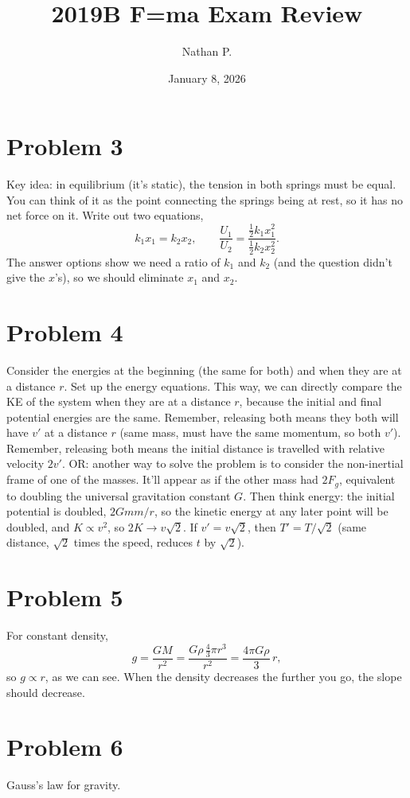 \documentclass[11pt]{article}
\title{2019B F=ma Exam Review}
\author{Nathan P.}
\date{January 8, 2026}
\begin{document}
\maketitle

\section*{Problem 3}
Key idea: in equilibrium (it's static), the tension in both springs must be equal. You can think of it as the point connecting the springs being at rest, so it has no net force on it.
Write out two equations,
\[
k_1x_1=k_2x_2,\qquad \frac{U_1}{U_2}=\frac{\tfrac12k_1x_1^2}{\tfrac12k_2x_2^2}.
\]
The answer options show we need a ratio of $k_1$ and $k_2$ (and the question didn't give the $x$'s), so we should eliminate $x_1$ and $x_2$.

\section*{Problem 4}
Consider the energies at the beginning (the same for both) and when they are at a distance $r$. Set up the energy equations. This way, we can directly compare the KE of the system when they are at a distance $r$, because the initial and final potential energies are the same.
Remember, releasing both means they both will have $v'$ at a distance $r$ (same mass, must have the same momentum, so both $v'$).
Remember, releasing both means the initial distance is travelled with relative velocity $2v'$.
OR: another way to solve the problem is to consider the non-inertial frame of one of the masses. It'll appear as if the other mass had $2F_g$, equivalent to doubling the universal gravitation constant $G$. Then think energy: the initial potential is doubled, $2Gmm/r$, so the kinetic energy at any later point will be doubled, and $K\propto v^2$, so $2K\to v\sqrt2$.
If $v'=v\sqrt2$, then $T'=T/\sqrt2$ (same distance, $\sqrt2$ times the speed, reduces $t$ by $\sqrt2$).

\section*{Problem 5}
For constant density,
\[
g=\frac{GM}{r^2}=\frac{G\rho\,\tfrac43\pi r^3}{r^2}=\frac{4\pi G\rho}{3}\,r,
\]
so $g\propto r$, as we can see.
When the density decreases the further you go, the slope should decrease.

\section*{Problem 6}
Gauss's law for gravity.
\end{document}

